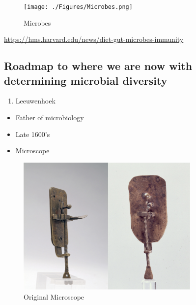 \documentclass[
]{book}
\providecommand{\tightlist}{%
  \setlength{\itemsep}{0pt}\setlength{\parskip}{0pt}}
\begin{document}
\begin{figure}
\centering
\texttt{[image: ./Figures/Microbes.png]}
\caption{Microbes}
\end{figure}

\url{https://hms.harvard.edu/news/diet-gut-microbes-immunity}

\hypertarget{roadmap-to-where-we-are-now-with-determining-microbial-diversity}{%
\subsection*{Roadmap to where we are now with determining microbial diversity}\label{roadmap-to-where-we-are-now-with-determining-microbial-diversity}}

\begin{enumerate}
\def\labelenumi{\arabic{enumi}.}
\tightlist
\item
  Leeuwenhoek
\end{enumerate}

\begin{itemize}
\tightlist
\item
  Father of microbiology
\item
  Late 1600's
\item
  Microscope
\end{itemize}

\begin{figure}
\centering
\includegraphics[width=0.8\textwidth,height=\textheight]{./Figures/Microscope.png}
\caption{Original Microscope}
\end{figure}
\end{document}
